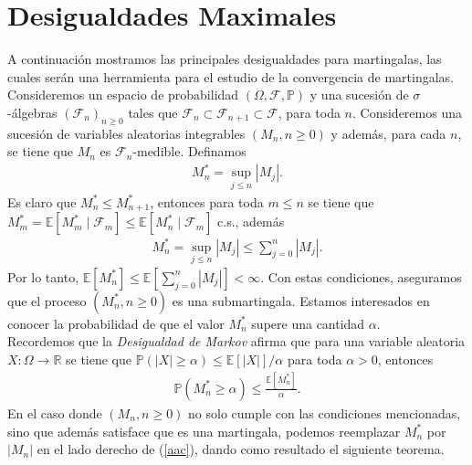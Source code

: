 \section{Desigualdades Maximales}
A continuación mostramos las principales desigualdades para martingalas, las cuales serán una herramienta para el estudio de la convergencia de martingalas. Consideremos un espacio de probabilidad $(\Omega, \mathcal{F}, \mathbb{P})$ y una sucesión de $\sigma$-álgebras $(\mathcal{F}_n)_{n \geq 0}$ tales que $\mathcal{F}_n \subset \mathcal{F}_{n+1} \subset \mathcal{F}$, para toda $n$. Consideremos una sucesión de variables aleatorias integrables $(M_n, n \geq 0)$ y además, para cada $n$, se tiene que $M_n$ es $\mathcal{F}_n$-medible. Definamos
\begin{align*}
	M_n^{*} = \sup_{j \leq n} |M_j|.
\end{align*}
Es claro que $M_n^{*} \leq M_{n+1}^{*}$, entonces para toda $m \leq n$ se tiene que $M_m^{*} = \mathbb{E}[M_m^{*} \mid \mathcal{F}_m] \leq \mathbb{E}[M_{n}^{*} \mid \mathcal{F}_m]$ c.s., además 
\begin{align*}
	M_n^{*} = \sup_{j \leq n} |M_j| \leq \sum_{j=0}^n |M_j|.
\end{align*}
Por lo tanto, $\mathbb{E}[M_n^{*} ]\leq \mathbb{E}[\sum_{j=0}^n |M_j|] < \infty$. Con estas condiciones, aseguramos que el proceso $(M_n^{*}, n \geq 0)$ es una submartingala. Estamos interesados en conocer la probabilidad de que el valor $M_n^{*}$ supere una cantidad $\alpha$. \\

Recordemos que la \emph{Desigualdad de Markov} afirma que \cite[p.~29]{jacodprotter} para una variable aleatoria $X: \Omega \rightarrow \mathbb{R}$ se tiene que $\mathbb{P}(|X| \geq \alpha) \leq \mathbb{E}[|X|]/\alpha$ para toda $\alpha > 0$, entonces
\begin{align}
	\mathbb{P}(M_n^{*} \geq \alpha) \leq \frac{\mathbb{E}[M_n^{*}]}{\alpha}. \label{aac}
\end{align}
En el caso donde $(M_n, n \geq 0)$ no solo cumple con las condiciones mencionadas, sino que además satisface que es una martingala, podemos reemplazar $M_n^{*}$ por $|M_n|$ en el lado derecho de (\ref{aac}), dando como resultado el siguiente teorema.

